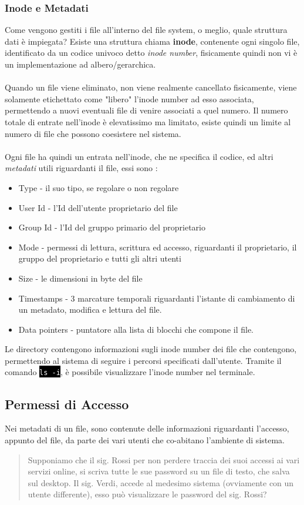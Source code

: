 \documentclass[12pt, letterpaper]{article}
\newcommand{\shelll}[1]{\colorbox{black}{\textcolor{white}{\texttt{#1}}}}
\newcommand{\acc}{\\\hphantom{}\\}
\begin{document}
 \subsubsection{Inode e Metadati}
 Come vengono gestiti i file all'interno del file system, o meglio, quale struttura dati è impiegata? Esiste una struttura chiama 
 \textbf{inode}, contenente ogni singolo file, identificato da un codice univoco detto \textit{inode number}, fisicamente quindi 
 non vi è un implementazione ad albero/gerarchica.\acc 
 Quando un file viene eliminato, non viene realmente cancellato fisicamente, viene solamente etichettato come "libero" l'inode 
 number ad esso associata, permettendo a nuovi eventuali file di venire associati a quel numero. Il numero totale di entrate 
 nell'inode è elevatissimo ma limitato, esiste quindi un limite al numero di file che possono coesistere nel sistema.\acc 
 Ogni file ha quindi un entrata nell'inode, che ne specifica il codice, ed altri \textit{metadati} utili riguardanti il file, 
 essi sono : \begin{itemize}
    \item Type - il suo tipo, se regolare o non regolare 
    \item User Id - l'Id dell'utente proprietario del file 
    \item Group Id - l'Id del gruppo primario del proprietario 
    \item Mode - permessi di lettura, scrittura ed accesso, riguardanti il proprietario, il gruppo del proprietario e 
    tutti gli altri  utenti
    \item Size - le dimensioni in byte del file 
    \item Timestamps - 3 marcature temporali riguardanti l'istante di cambiamento di un metadato, modifica e lettura del file.
    \item Data pointers - puntatore alla lista di blocchi che compone il file.
 \end{itemize} 
 Le directory contengono informazioni sugli inode number dei file che contengono, permettendo al sistema di seguire i percorsi 
 specificati dall'utente. Tramite il comando \shelll{ls -i},  è possibile visualizzare 
 l'inode number  nel terminale.\subsection{Permessi di Accesso}
 Nei metadati di un file, sono contenute delle informazioni riguardanti l'accesso, appunto del file, da parte dei vari utenti 
 che co-abitano l'ambiente di sistema. \begin{quote}
Supponiamo che il sig. Rossi per non perdere traccia dei suoi accessi ai vari servizi 
 online, si scriva tutte le sue password su un file di testo, che salva sul desktop. Il sig. Verdi, accede al medesimo sistema 
 (ovviamente con un utente differente), esso può visualizzare le password del sig. Rossi?    
\end{quote}
\end{document}
